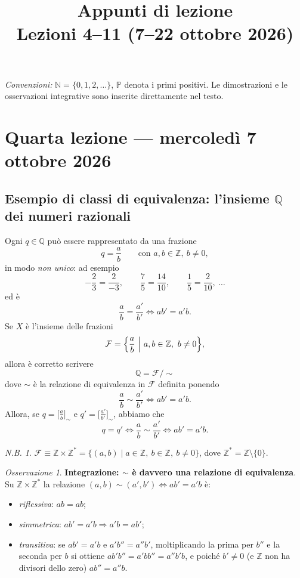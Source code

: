 \documentclass[11pt,a4paper]{article}
\title{Appunti di lezione\\[2pt]\large Lezioni 4--11 (7--22 ottobre 2026)}
\author{}
\date{}
\newcommand{\N}{\mathbb{N}}
\newcommand{\Z}{\mathbb{Z}}
\newcommand{\Q}{\mathbb{Q}}
\newcommand{\Prim}{\mathbb{P}}
\newcommand{\Fr}{\mathcal{F}}
\theoremstyle{definition}
\theoremstyle{plain}
\theoremstyle{remark}
\newtheorem*{nb}{N.B.}
\newtheorem*{osservazione}{Osservazione}
\begin{document}
\maketitle

\noindent\textit{Convenzioni:} $\N=\{0,1,2,\dots\}$, $\Prim$ denota i primi positivi. Le dimostrazioni e le osservazioni integrative sono inserite direttamente nel testo.

\tableofcontents

\section{Quarta lezione --- mercoled\`i 7 ottobre 2026}

\subsection{Esempio di classi di equivalenza: l'insieme $\Q$ dei numeri razionali}

Ogni $q\in\Q$ pu\`o essere rappresentato da una frazione
\[
q=\frac{a}{b}\qquad\text{con } a,b\in\Z,\ b\neq 0,
\]
in modo \emph{non unico}: ad esempio
\[
-\frac{2}{3}=\frac{2}{-3},\qquad \frac{7}{5}=\frac{14}{10},\qquad \frac{1}{5}=\frac{2}{10},\ \dots
\]
ed \`e
\[
\frac{a}{b}=\frac{a'}{b'}\iff ab'=a'b .
\]
Se $X$ \`e l'insieme delle frazioni
\[
\Fr=\Bigl\{\frac{a}{b}\ \Big|\ a,b\in\Z,\ b\neq 0\Bigr\},
\]
allora \`e corretto scrivere
\[
\Q=\Fr/{\sim}
\]
dove $\sim$ \`e la relazione di equivalenza in $\Fr$ definita ponendo
\[
\frac{a}{b}\sim\frac{a'}{b'}\iff ab'=a'b .
\]
Allora, se $q=\bigl[\frac{a}{b}\bigr]_\sim$ e $q'=\bigl[\frac{a'}{b'}\bigr]_\sim$, abbiamo che
\[
q=q'\iff \frac{a}{b}\sim\frac{a'}{b'}\iff ab'=a'b .
\]

\begin{nb}
$\Fr\equiv\Z\times\Z^*=\{(a,b)\mid a\in\Z,\ b\in\Z,\ b\neq0\}$, dove $\Z^*=\Z\setminus\{0\}$.
\end{nb}

\begin{osservazione}
\textbf{Integrazione: $\sim$ \`e davvero una relazione di equivalenza}. 
Su $\Z\times\Z^*$ la relazione $(a,b)\sim(a',b')\iff ab'=a'b$ \`e:
\begin{itemize}[nosep]
\item \emph{riflessiva}: $ab=ab$;
\item \emph{simmetrica}: $ab'=a'b\Rightarrow a'b=ab'$;
\item \emph{transitiva}: se $ab'=a'b$ e $a'b''=a''b'$, moltiplicando la prima per $b''$ e la seconda per $b$ si ottiene $ab'b''=a'bb''=a''b'b$, e poich\'e $b'\neq0$ (e $\Z$ non ha divisori dello zero) $ab''=a''b$.
\end{itemize}
\end{osservazione}
\end{document}
